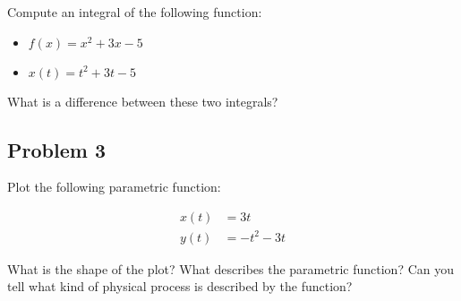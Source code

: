 \documentclass[11pt]{article}
\begin{document}
Compute an integral of the following function:

\begin{itemize}
    \item $f(x) = x^2 + 3x - 5$
    \item $x(t) = t^2 + 3t - 5$
\end{itemize}

What is a difference between these two integrals?

\subsection*{Problem 3}

Plot the following parametric function:

\begin{align*}
 x(t) &= 3t \\
 y(t) &= -t^2 - 3t
\end{align*}

What is the shape of the plot?
What describes the parametric function?
Can you tell what kind of physical process is described by the function?
\end{document}
